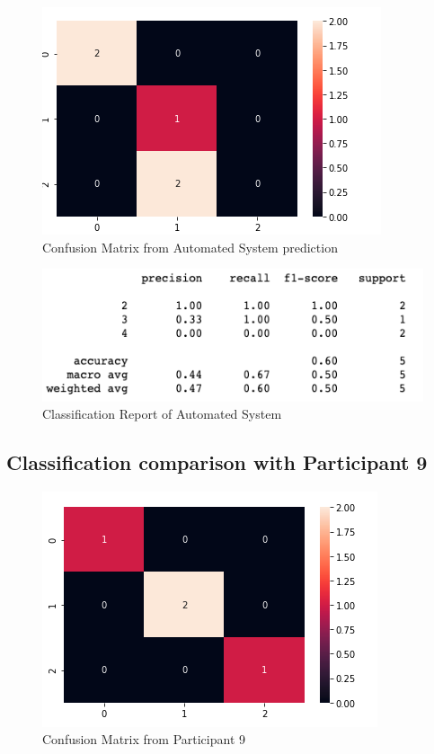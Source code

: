 \pagebreak

\begin{figure}[!htp]
    \includegraphics[width=\textwidth]{Images/a8.png}
    \caption{Confusion Matrix from Automated System prediction}
    \label{fig:f11}
\end{figure}

\begin{figure}[!htp]
    \includegraphics[width=\textwidth]{Images/a8r.png}
    \caption{Classification Report of Automated System}
    \label{fig:f11}
\end{figure}

\pagebreak
\subsection*{Classification comparison with Participant 9}

\begin{figure}[!htp]
    \includegraphics[width=\textwidth]{Images/p9.png}
    \caption{Confusion Matrix from Participant 9}
    \label{fig:f11}
\end{figure}

